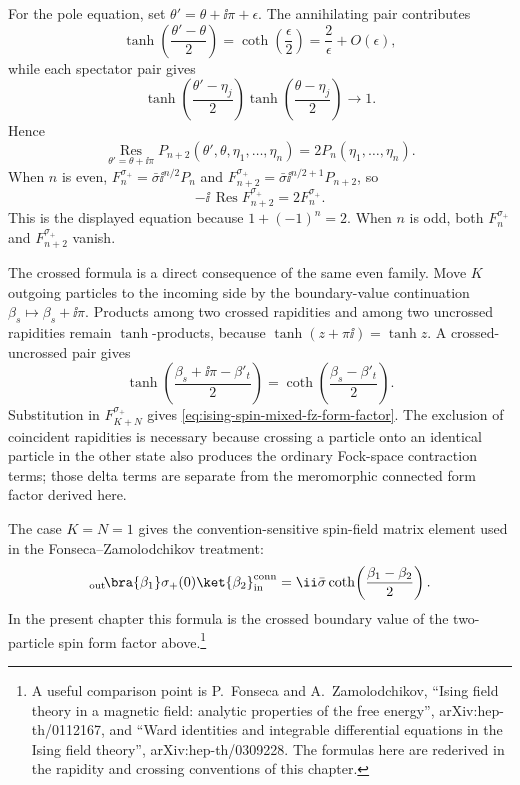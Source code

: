For the pole equation, set \(\theta'=\theta+\ii\pi+\epsilon\).  The
annihilating pair contributes
\[
  \tanh\!\left(\frac{\theta'-\theta}{2}\right)
  =
  \coth\!\left(\frac{\epsilon}{2}\right)
  =
  \frac{2}{\epsilon}+O(\epsilon),
\]
while each spectator pair gives
\[
  \tanh\!\left(\frac{\theta'-\eta_j}{2}\right)
  \tanh\!\left(\frac{\theta-\eta_j}{2}\right)
  \longrightarrow 1 .
\]
Hence
\[
  \operatorname*{Res}_{\theta'=\theta+\ii\pi}
  P_{n+2}(\theta',\theta,\eta_1,\ldots,\eta_n)
  =
  2P_n(\eta_1,\ldots,\eta_n).
\]
When \(n\) is even, \(F_n^{\sigma_+}=\bar\sigma \ii^{n/2}P_n\) and
\(F_{n+2}^{\sigma_+}=\bar\sigma \ii^{n/2+1}P_{n+2}\), so
\[
  -\ii\,\operatorname*{Res}F_{n+2}^{\sigma_+}
  =
  2F_n^{\sigma_+}.
\]
This is the displayed equation because \(1+(-1)^n=2\).  When \(n\) is odd,
both \(F_n^{\sigma_+}\) and \(F_{n+2}^{\sigma_+}\) vanish.

The crossed formula is a direct consequence of the same even family.  Move
\(K\) outgoing particles to the incoming side by the boundary-value
continuation \(\beta_s\mapsto\beta_s+\ii\pi\).  Products among two crossed
rapidities and among two uncrossed rapidities remain \(\tanh\)-products,
because \(\tanh(z+\pi\ii)=\tanh z\).  A crossed-uncrossed pair gives
\[
  \tanh\!\left(\frac{\beta_s+\ii\pi-\beta'_t}{2}\right)
  =
  \coth\!\left(\frac{\beta_s-\beta'_t}{2}\right).
\]
Substitution in \(F_{K+N}^{\sigma_+}\) gives
\eqref{eq:ising-spin-mixed-fz-form-factor}.  The exclusion of coincident
rapidities is necessary because crossing a particle onto an identical
particle in the other state also produces the ordinary Fock-space contraction
terms; those delta terms are separate from the meromorphic connected form
factor derived here.

The case \(K=N=1\) gives the convention-sensitive spin-field matrix element
used in the Fonseca--Zamolodchikov treatment:
\[
  {}_{\rm out}\!\bra{\beta_1}\sigma_+(0)\ket{\beta_2}_{\rm in}^{\rm conn}
  =
  \ii\bar\sigma
  \coth\!\left(\frac{\beta_1-\beta_2}{2}\right).
\]
In the present chapter this formula is the crossed boundary value of the
two-particle spin form factor above.\footnote{A
useful comparison point is P.~Fonseca and A.~Zamolodchikov,
``Ising field theory in a magnetic field: analytic properties of the free
energy'', arXiv:hep-th/0112167, and ``Ward identities and integrable
differential equations in the Ising field theory'', arXiv:hep-th/0309228.
The formulas here are rederived in the rapidity and crossing conventions of
this chapter.}

